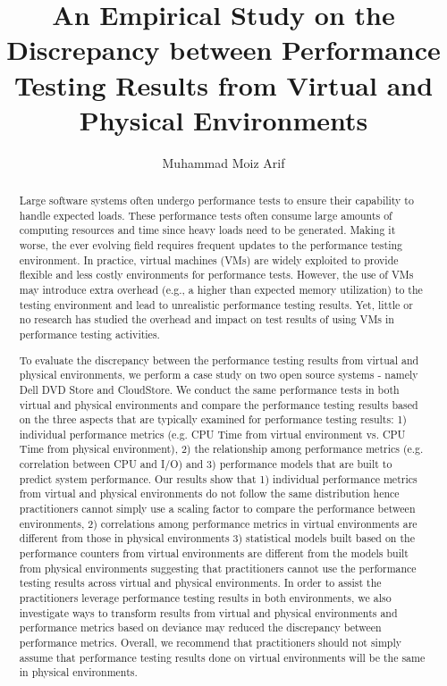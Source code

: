 \documentclass[12pt]{report}
\author{Muhammad Moiz Arif}
\title {An Empirical Study on the Discrepancy between Performance Testing Results from Virtual and Physical Environments}
\begin{document}
\begin{abstract}

Large software systems often undergo performance tests to ensure their capability to handle expected loads. These performance tests often consume large amounts of computing resources and time since heavy loads need to be generated. Making it worse, the ever evolving field requires frequent updates to the performance testing environment. In practice, virtual machines (VMs) are widely exploited to provide flexible and less costly environments for performance tests. However, the use of VMs may introduce extra overhead (e.g., a higher than expected memory utilization) to the testing environment and lead to unrealistic performance testing results. Yet, little or no research has studied the overhead and impact on test results of using VMs in performance testing activities. 

To evaluate the discrepancy between the performance testing results from virtual and physical environments, we perform a case study on two open source systems - namely Dell DVD Store and CloudStore. We conduct the same performance tests in both virtual and physical environments and compare the performance testing results based on the three aspects that are typically examined for performance testing results: 1) individual performance metrics (e.g. CPU Time from virtual environment vs. CPU Time from physical environment), 2) the relationship among performance metrics (e.g. correlation between CPU and I/O) and 3) performance models that are built to predict system performance. Our results show that 1) individual performance metrics from virtual and physical environments do not follow the same distribution hence practitioners cannot simply use a scaling factor to compare the performance between environments,  2) correlations among performance metrics in virtual environments are different from those in physical environments 3) statistical models built based on the performance counters from virtual environments are different from the models built from physical environments suggesting that practitioners cannot use the performance testing results across virtual and physical environments. In order to assist the practitioners leverage performance testing results in both environments, we also investigate ways to transform results from virtual and physical environments and performance metrics based on deviance may reduced the discrepancy between performance metrics. Overall, we recommend that practitioners should not simply assume that performance testing results done on virtual environments will be the same in physical environments.

\end{abstract}
\end{document}
